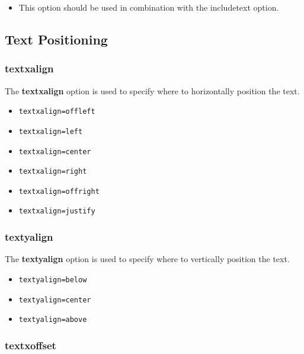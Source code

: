 \begin{itemize}
\tightlist
\item
  This option should be used in combination with the includetext option.
\end{itemize}

\hypertarget{text-positioning}{%
\subsection{Text Positioning}\label{text-positioning}}

\hypertarget{textxalign}{%
\subsubsection{textxalign}\label{textxalign}}

The \textbf{textxalign} option is used to specify where to horizontally
position the text.

\begin{itemize}
\tightlist
\item
  \texttt{textxalign=offleft}
\item
  \texttt{textxalign=left}
\item
  \texttt{textxalign=center}
\item
  \texttt{textxalign=right}
\item
  \texttt{textxalign=offright}
\item
  \texttt{textxalign=justify}
\end{itemize}

\hypertarget{textyalign}{%
\subsubsection{textyalign}\label{textyalign}}

The \textbf{textyalign} option is used to specify where to vertically
position the text.

\begin{itemize}
\tightlist
\item
  \texttt{textyalign=below}
\item
  \texttt{textyalign=center}
\item
  \texttt{textyalign=above}
\end{itemize}

\hypertarget{textxoffset}{%
\subsubsection{textxoffset}\label{textxoffset}}

